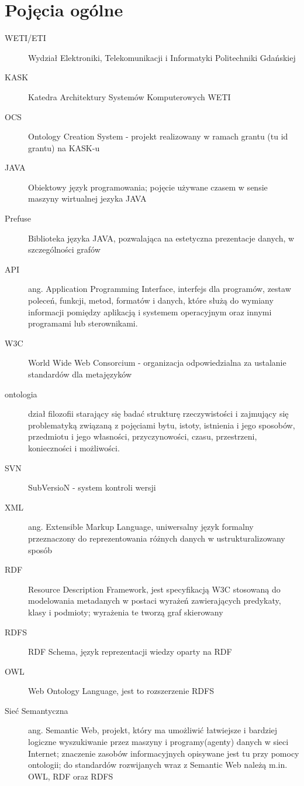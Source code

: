 \documentclass[a4paper,10pt]{article}
\begin{document}
\section{Pojęcia ogólne}
\begin{description}
	\item[WETI/ETI] Wydział Elektroniki, Telekomunikacji i Informatyki Politechniki Gdańskiej
	\item[KASK] Katedra Architektury Systemów Komputerowych WETI
 	\item[OCS] Ontology  Creation System - projekt realizowany w ramach grantu (tu id grantu) na KASK-u
	\item[JAVA] Obiektowy język programowania; pojęcie używane czasem w sensie maszyny wirtualnej jezyka JAVA  
	\item[Prefuse] Biblioteka języka JAVA, pozwalająca na estetyczna prezentacje danych, w szczególności grafów
	\item[API] ang. Application Programming Interface, interfejs dla programów, zestaw poleceń, funkcji, metod, formatów i danych, które służą do wymiany informacji pomiędzy aplikacją i systemem operacyjnym oraz innymi programami lub sterownikami.
	\item[W3C] World Wide Web Consorcium - organizacja odpowiedzialna za ustalanie standardów dla metajęzyków
	\item[ontologia] dział filozofii starający się badać strukturę rzeczywistości i zajmujący się problematyką związaną z pojęciami bytu, istoty, istnienia i jego sposobów, przedmiotu i jego własności, przyczynowości, czasu, przestrzeni, konieczności i możliwości.
	\item[SVN] SubVersioN - system kontroli wersji
	\item[XML] ang. Extensible Markup Language, uniwersalny język formalny przeznaczony do reprezentowania różnych danych w ustrukturalizowany sposób
	\item[RDF] Resource Description Framework, jest specyfikacją W3C stosowaną do modelowania metadanych w postaci wyrażeń zawierających predykaty, klasy i podmioty; wyrażenia te tworzą graf skierowany
	\item[RDFS] RDF Schema, język reprezentacji wiedzy oparty na RDF 
	\item[OWL] Web Ontology Language, jest to rozszerzenie RDFS
	\item[Sieć Semantyczna] ang. Semantic Web, projekt, który ma umożliwić łatwiejsze i bardziej logiczne wyszukiwanie przez maszyny i programy(agenty) danych w sieci Internet; znaczenie zasobów informacyjnych opisywane jest tu przy pomocy ontologii; do standardów rozwijanych wraz z Semantic Web należą m.in. OWL, RDF oraz RDFS 

\end{description}
\end{document}
